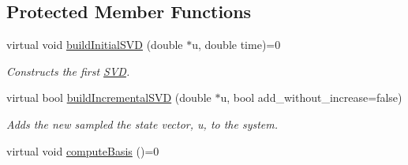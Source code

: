 \subsection*{Protected Member Functions}
\begin{DoxyCompactItemize}
\item 
virtual void \hyperlink{class_c_a_r_o_m_1_1_incremental_s_v_d_a4c079657671bf4d6a281a28f358d38c0}{build\-Initial\-S\-V\-D} (double $\ast$u, double time)=0
\begin{DoxyCompactList}\small\item\em Constructs the first \hyperlink{class_c_a_r_o_m_1_1_s_v_d}{S\-V\-D}. \end{DoxyCompactList}\item 
virtual bool \hyperlink{class_c_a_r_o_m_1_1_incremental_s_v_d_afb79688afbe7988cc5cbd56ec18f8ffb}{build\-Incremental\-S\-V\-D} (double $\ast$u, bool add\-\_\-without\-\_\-increase=false)
\begin{DoxyCompactList}\small\item\em Adds the new sampled the state vector, u, to the system. \end{DoxyCompactList}\item 
\hypertarget{class_c_a_r_o_m_1_1_incremental_s_v_d_a552daa55d3af451c56c00e43625b92b5}{virtual void \hyperlink{class_c_a_r_o_m_1_1_incremental_s_v_d_a552daa55d3af451c56c00e43625b92b5}{compute\-Basis} ()=0}\label{class_c_a_r_o_m_1_1_incremental_s_v_d_a552daa55d3af451c56c00e43625b92b5}


\end{DoxyCompactItemize}
